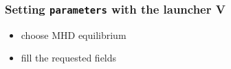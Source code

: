 \documentclass[9pt]{beamer}
\begin{document}
{
\begin{frame}[fragile]
  \frametitle{Setting {\tt parameters} with the launcher V}

\vspace{5.25cm}

\begin{block}{}
\begin{itemize}
\item choose MHD equilibrium
\item fill the requested fields
\end{itemize}
\end{block}

\end{frame}
}

\end{document}
